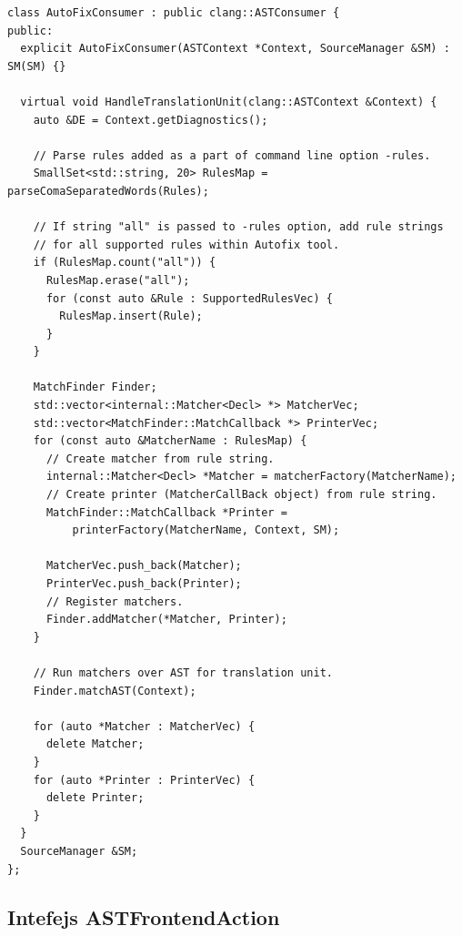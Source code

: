 \documentclass[12pt,oneside]{memoir}
\begin{document}
\begin{lstlisting}[style=customc,  caption={Implementacija klase \texttt{AutoFixConsumer} u okviru alata \textit{AutoFix}.}, label=lst:labelConsumer]
class AutoFixConsumer : public clang::ASTConsumer {
public:
  explicit AutoFixConsumer(ASTContext *Context, SourceManager &SM) : SM(SM) {}

  virtual void HandleTranslationUnit(clang::ASTContext &Context) {
    auto &DE = Context.getDiagnostics();

    // Parse rules added as a part of command line option -rules.
    SmallSet<std::string, 20> RulesMap = parseComaSeparatedWords(Rules);

    // If string "all" is passed to -rules option, add rule strings
    // for all supported rules within Autofix tool.
    if (RulesMap.count("all")) {
      RulesMap.erase("all");
      for (const auto &Rule : SupportedRulesVec) {
        RulesMap.insert(Rule);
      }
    }

    MatchFinder Finder;
    std::vector<internal::Matcher<Decl> *> MatcherVec;
    std::vector<MatchFinder::MatchCallback *> PrinterVec;
    for (const auto &MatcherName : RulesMap) {
      // Create matcher from rule string.
      internal::Matcher<Decl> *Matcher = matcherFactory(MatcherName);
      // Create printer (MatcherCallBack object) from rule string.
      MatchFinder::MatchCallback *Printer =
          printerFactory(MatcherName, Context, SM);

      MatcherVec.push_back(Matcher);
      PrinterVec.push_back(Printer);
      // Register matchers.
      Finder.addMatcher(*Matcher, Printer);
    }

    // Run matchers over AST for translation unit.
    Finder.matchAST(Context);

    for (auto *Matcher : MatcherVec) {
      delete Matcher;
    }
    for (auto *Printer : PrinterVec) {
      delete Printer;
    }
  }
  SourceManager &SM;
};
\end{lstlisting}

\subsection{Intefejs ASTFrontendAction}
\end{document}
